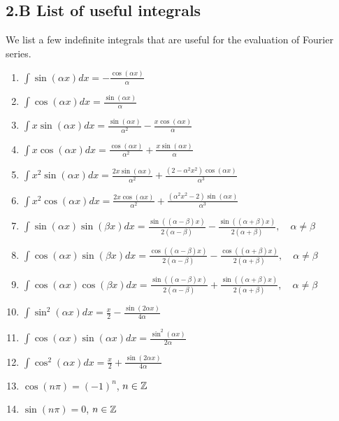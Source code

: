 \subsection{2.B List of useful integrals}
We list a few indefinite integrals that are useful for the evaluation of Fourier series.
\begin{enumerate}
    \item $\displaystyle\int \sin(\alpha x) dx = -\frac{\cos(\alpha x)}{\alpha}$
    \item $\displaystyle\int \cos(\alpha x) dx = \frac{\sin(\alpha x)}{\alpha}$
    \item $\displaystyle\int x \sin(\alpha x) dx = \frac{\sin(\alpha x)}{\alpha^2} - \frac{x \cos(\alpha x)}{\alpha}$
    \item $\displaystyle\int x \cos(\alpha x) dx = \frac{\cos(\alpha x)}{\alpha^2} + \frac{x \sin(\alpha x)}{\alpha}$
    \item $\displaystyle\int x^2 \sin(\alpha x) dx = \frac{2x \sin(\alpha x)}{\alpha^2} + \frac{(2 - \alpha^2 x^2) \cos(\alpha x)}{\alpha^3}$
    \item $\displaystyle\int x^2 \cos(\alpha x) dx = \frac{2x \cos(\alpha x)}{\alpha^2} + \frac{(\alpha^2 x^2 - 2) \sin(\alpha x)}{\alpha^3}$
    \item $\displaystyle\int \sin(\alpha x) \sin(\beta x) dx = \frac{\sin((\alpha - \beta)x)}{2(\alpha - \beta)} - \frac{\sin((\alpha + \beta)x)}{2(\alpha + \beta)}, \quad \alpha \neq \beta$
    \item $\displaystyle\int \cos(\alpha x) \sin(\beta x) dx = \frac{\cos((\alpha - \beta)x)}{2(\alpha - \beta)} - \frac{\cos((\alpha + \beta)x)}{2(\alpha + \beta)}, \quad \alpha \neq \beta$
    \item $\displaystyle\int \cos(\alpha x) \cos(\beta x) dx = \frac{\sin((\alpha - \beta)x)}{2(\alpha - \beta)} + \frac{\sin((\alpha + \beta)x)}{2(\alpha + \beta)}, \quad \alpha \neq \beta$
    \item $\displaystyle\int \sin^2(\alpha x) dx = \frac{x}{2} - \frac{\sin(2\alpha x)}{4\alpha}$
    \item $\displaystyle\int \cos(\alpha x) \sin(\alpha x) dx = \frac{\sin^2(\alpha x)}{2\alpha}$
    \item $\displaystyle\int \cos^2(\alpha x) dx = \frac{x}{2} + \frac{\sin(2\alpha x)}{4\alpha}$
    \item $\cos(n\pi) = (-1)^n$, $n \in \mathbb{Z}$
    \item $\sin(n\pi) = 0$, $n \in \mathbb{Z}$
\end{enumerate}
